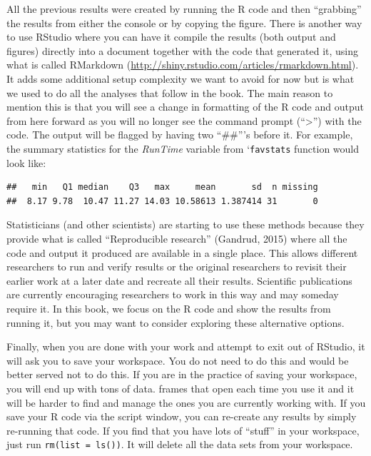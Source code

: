 \documentclass[]{article}
\newenvironment{Shaded}{\begin{snugshade}}{\end{snugshade}}
\newcommand{\KeywordTok}[1]{\textcolor[rgb]{0.13,0.29,0.53}{\textbf{{#1}}}}
\newcommand{\NormalTok}[1]{{#1}}
\begin{document}
All the previous results were created by running the R code and then
``grabbing'' the results from either the console or by copying the
figure. There is another way to use RStudio where you can have it
compile the results (both output and figures) directly into a document
together with the code that generated it, using what is called RMarkdown
(\url{http://shiny.rstudio.com/articles/rmarkdown.html}). It adds some
additional setup complexity we want to avoid for now but is what we used
to do all the analyses that follow in the book. The main reason to
mention this is that you will see a change in formatting of the R code
and output from here forward as you will no longer see the command
prompt (``\textgreater{}'') with the code. The output will be flagged by
having two ``\#\#'''s before it. For example, the summary statistics for
the \emph{RunTime} variable from `\texttt{favstats} function would look
like:

\begin{Shaded}
\end{Shaded}

\begin{verbatim}
##   min   Q1 median    Q3   max     mean       sd  n missing
##  8.17 9.78  10.47 11.27 14.03 10.58613 1.387414 31       0
\end{verbatim}

Statisticians (and other scientists) are starting to use these methods
because they provide what is called ``Reproducible research'' (Gandrud,
2015) where all the code and output it produced are available in a
single place. This allows different researchers to run and verify
results or the original researchers to revisit their earlier work at a
later date and recreate all their results. Scientific publications are
currently encouraging researchers to work in this way and may someday
require it. In this book, we focus on the R code and show the results
from running it, but you may want to consider exploring these
alternative options.

Finally, when you are done with your work and attempt to exit out of
RStudio, it will ask you to save your workspace. You do not need to do
this and would be better served not to do this. If you are in the
practice of saving your workspace, you will end up with tons of data.
frames that open each time you use it and it will be harder to find and
manage the ones you are currently working with. If you save your R code
via the script window, you can re-create any results by simply
re-running that code. If you find that you have lots of ``stuff'' in
your workspace, just run \texttt{rm(list\ =\ ls())}. It will delete all
the data sets from your workspace.
\end{document}
